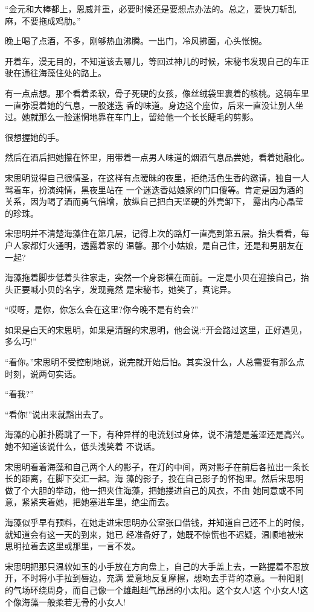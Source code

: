 \documentclass[11pt,a4paper,onecolumn]{article}
\begin{document}
``金元和大棒都上，恩威并重，必要时候还是要想点办法的。总之，要快刀斩乱麻，不要拖成鸡肋。''

晚上喝了点酒，不多，刚够热血沸腾。一出门，冷风拂面，心头怅惋。

开着车，漫无目的，不知道该去哪儿，等回过神儿的时候，宋秘书发现自己的车正驶在通往海藻住处的路上。

有一点点想。那个看着柔软，骨子死硬的女孩，像丝绒袋里裹着的核桃。这辆车里一直弥漫着她的气息，一股迷迭
香的味道。身边这个座位，后来一直没让别人坐过。她就那么一脸迷惘地靠在车门上，留给他一个长长睫毛的剪影。

很想握她的手。

然后在酒后把她攥在怀里，用带着一点男人味道的烟酒气息品尝她，看着她融化。

宋思明觉得自己很情圣，在这样有点暧昧的夜里，拒绝活色生香的邀请，独自一人驾着车，扮演纯情，黑夜里站在
一个迷迭香姑娘家的门口傻等。肯定是因为酒的关系，因为喝了酒而勇气倍增，放纵自己把白天坚硬的外壳卸下，
露出内心晶莹的珍珠。

宋思明并不清楚海藻住在第几层，记得上次的路灯一直亮到第五层。抬头看看，每户人家都灯火通明，透露着家的
温馨。那个小姑娘，是自己住，还是和男朋友在一起?

海藻拖着脚步低着头往家走，突然一个身影横在面前。一定是小贝在迎接自己，抬头正要喊小贝的名字，发现竟然
是宋秘书，她笑了，真诧异。

``哎呀，是你，你怎么会在这里?你今晚不是有约会?''

如果是白天的宋思明，如果是清醒的宋思明，他会说:``开会路过这里，正好遇见，多么巧!''

``看你。''宋思明不受控制地说，说完就开始后怕。其实没什么，人总需要有那么点时刻，说两句实话。

``看我?''

``看你!''说出来就豁出去了。

海藻的心脏扑腾跳了一下，有种异样的电流划过身体，说不清楚是羞涩还是高兴。她不知道该说什么，低头浅笑着
不说话。

宋思明看着海藻和自己两个人的影子，在灯的中间，两对影子在前后各拉出一条长长的距离，在脚下交汇一起。海
藻的影子，投在自己影子的怀抱里。然后宋思明做了个大胆的举动，他一把夹住海藻，把她搂进自己的风衣，不由
她同意或不同意，紧紧夹着她，把她塞进车里，绝尘而去。

海藻似乎早有预料，在她走进宋思明办公室张口借钱，并知道自己还不上的时候，就知道会有这一天的到来，她已
经准备好了，她既不惊慌也不迟疑，温顺地被宋思明拉着去这里或那里，一言不发。

宋思明把那只温软如玉的小手放在方向盘上，自己的大手盖上去，一路握着不忍放开，不时将小手拉到唇边，充满
爱意地反复摩擦，想吻去手背的凉意。一种阳刚的气场环绕周身，而自己像一个雄赳赳气昂昂的小太阳。这个女人!这
个小女人!这个像海藻一般柔若无骨的小女人!
\end{document}

